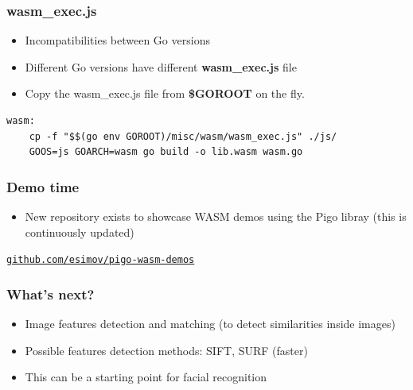 \documentclass[9pt]{beamer}
\newcommand{\myblue} [1] {{\color{blue}#1}}
\begin{document}
\begin{frame}[fragile]
\frametitle{wasm\_exec.js}


\begin{itemize}
\item Incompatibilities between Go versions
\item Different Go versions have different \textbf{wasm\_exec.js} file
\item Copy the wasm\_exec.js file from \textbf{\$GOROOT} on the fly.
\end{itemize}


\begin{verbatim}
wasm:
    cp -f "$$(go env GOROOT)/misc/wasm/wasm_exec.js" ./js/
    GOOS=js GOARCH=wasm go build -o lib.wasm wasm.go

\end{verbatim}



\end{frame}

\begin{frame}[fragile]
\frametitle{Demo time}


\begin{itemize}
\item New repository exists to showcase WASM demos using the Pigo libray (this is continuously updated)
\end{itemize}

\myblue{\href{https://github.com/esimov/pigo-wasm-demos}{\texttt{github.com/esimov/pigo-wasm-demos}}}


\end{frame}

\begin{frame}[fragile]
\frametitle{What's next?}


\begin{itemize}
\item Image features detection and matching (to detect similarities inside images)
\item Possible features detection methods: SIFT, SURF (faster)
\item This can be a starting point for facial recognition
\end{itemize}


\end{frame}
\end{document}
